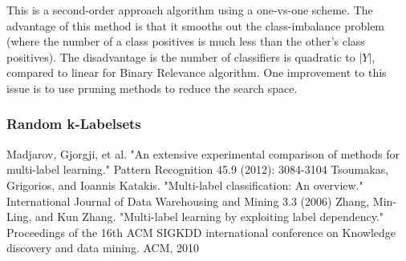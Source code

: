 \documentclass[12pt]{report}
\begin{document}
	This is a second-order approach algorithm using a one-vs-one scheme. The advantage of this method is that it smooths out the class-imbalance problem (where the number of a class positives is much less than the other's class positives). The disadvantage is the number of classifiers is quadratic to $|Y|$, compared to linear for Binary Relevance algorithm. One improvement to this issue is to use pruning methods to reduce the search space.
	
	\subsubsection*{Random k-Labelsets}
	\newpage
	\begin{thebibliography}{10}
		Madjarov, Gjorgji, et al. "An extensive experimental comparison of methods for multi-label learning." Pattern Recognition 45.9 (2012): 3084-3104
		 Tsoumakas, Grigorios, and Ioannis Katakis. "Multi-label classification: An overview." International Journal of Data Warehousing and Mining 3.3 (2006)
		 Zhang, Min-Ling, and Kun Zhang. "Multi-label learning by exploiting label dependency." Proceedings of the 16th ACM SIGKDD international conference on Knowledge discovery and data mining. ACM, 2010
	\end{thebibliography}
\end{document}
